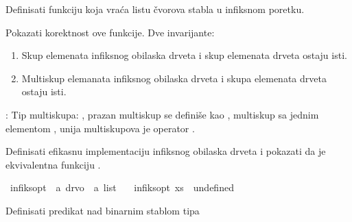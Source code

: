 \begin{isabellebody}
%
\begin{exercise}[subtitle=Obilazak stabla]
%
\begin{isamarkuptext}%
Definisati funkciju  koja vraća listu čvorova stabla u infiksnom poretku.%
\end{isamarkuptext}\isamarkuptrue%
%
\begin{isamarkuptext}%
Pokazati korektnost ove funkcije. Dve invarijante:%
\end{isamarkuptext}\isamarkuptrue%
%
\begin{enumerate} 
  \item Skup elemenata infiksnog obilaska drveta i skup elemenata drveta ostaju isti.
  \item Multiskup elemanata infiksnog obilaska drveta i skupa elemenata drveta ostaju isti.
\end{enumerate}
%
\begin{isamarkuptext}%
: Tip multiskupa: ,
               prazan multiskup se definiše kao \isa{{\isacharbraceleft}{\kern0pt}{\isacharhash}{\kern0pt}{\isacharbraceright}{\kern0pt}}, 
               multiskup sa jednim elementom ,
               unija multiskupova je operator \isa{{\isacharplus}{\kern0pt}}.%
\end{isamarkuptext}\isamarkuptrue%
%
\begin{isamarkuptext}%
Definisati efikasnu implementaciju infiksnog obilaska drveta  i 
      pokazati da je ekvivalentna funkciju .%
\end{isamarkuptext}\isamarkuptrue%
\isamarkupfalse%
\ infiks{\isacharunderscore}{\kern0pt}opt\ {\isacharcolon}{\kern0pt}{\isacharcolon}{\kern0pt}\ {\isachardoublequoteopen}{\isacharprime}{\kern0pt}a\ drvo\ {\isasymRightarrow}\ {\isacharprime}{\kern0pt}a\ list{\isachardoublequoteclose}\ \isanewline
\ \ {\isachardoublequoteopen}infiks{\isacharunderscore}{\kern0pt}opt\ xs\ {\isacharequal}{\kern0pt}\ undefined{\isachardoublequoteclose}%
\end{exercise}
%
\begin{exercise}[subtitle=Binarno pretraživačko stablo.]
%
\begin{isamarkuptext}%
Definisati predikat  nad binarnim stablom tipa 

\end{isamarkuptext}
\end{exercise}
\end{isabellebody}
